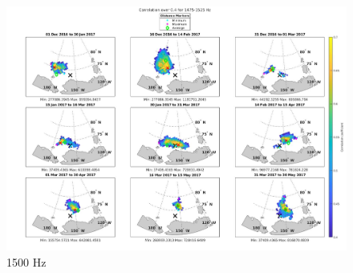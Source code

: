 \begin{figure}[p]
\centering
\includegraphics[scale=0.28]{Figures/megamap_noisland_0.4_1500.jpg}
\caption{1500 Hz}
\end{figure}

